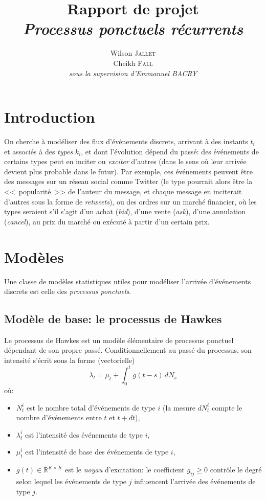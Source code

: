 \documentclass[11pt]{article}
\title{\textbf{Rapport de projet}\\
  \textit{Processus ponctuels récurrents}
}
\author{
  Wilson \textsc{Jallet}\\
  Cheikh \textsc{Fall}\\
  \textit{sous la supervision d'Emmanuel BACRY}
}
\newcommand{\RR}{\mathbb{R}}
\begin{document}
\maketitle

\section{Introduction}

On cherche à modéliser des flux d'événements discrets, arrivant à des instants $t_i$ et associés à des \textit{types} $k_i$, et dont l'évolution dépend du passé: des événements de certains types peut en inciter ou \textit{exciter} d'autres (dans le sens où leur arrivée devient plus probable dans le futur). Par exemple, ces événements peuvent être des messages sur un réseau social comme Twitter (le type pourrait alors être la <<~popularité~>> de l'auteur du message, et chaque message en inciterait d'autres sous la forme de \textit{retweets}), ou des ordres sur un marché financier, où les types seraient s'il s'agit d'un achat (\textit{bid}), d'une vente (\textit{ask}), d'une annulation (\textit{cancel}), au prix du marché ou exécuté à partir d'un certain prix.

\section{Modèles}

Une classe de modèles statistiques utiles pour modéliser l'arrivée d'événements discrets est celle des \textit{processus ponctuels}.

\subsection{Modèle de base: le processus de Hawkes}

Le processus de Hawkes est un modèle élémentaire de processus ponctuel dépendant de son propre passé. Conditionnellement au passé du processus, son intensité s'écrit sous la forme (vectorielle)
\begin{equation}
	\lambda_t = \mu_t + \int_0^t g(t-s)\,dN_s
\end{equation}
où:\begin{itemize}
	\item $N^i_t$ est le nombre total d'événements de type $i$ (la mesure $dN^i_t$ compte le nombre d'événements entre $t$ et $t+dt$),
	\item $\lambda_t^i$ est l'intensité des événements de type $i$,
	\item $\mu^i_t$ est l'intensité de base des événements de type $i$,
	\item $g(t) \in \RR^{K\times K}$ est le \textit{noyau} d'excitation: le coefficient $g_{ij} \geq 0$ contrôle le degré selon lequel les événements de type $j$ influencent l'arrivée des événements de type $j$.
\end{itemize} 
\end{document}
